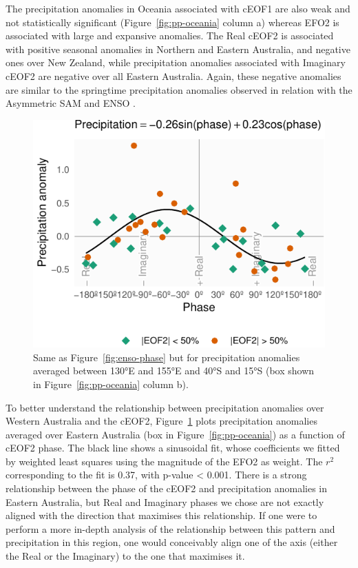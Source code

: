 \documentclass[smallextended]{svjour3}       %
\begin{document}
The precipitation anomalies in Oceania associated with cEOF1 are also weak and not statistically significant (Figure~\ref{fig:pp-oceania} column a) whereas EFO2 is associated with large and expansive anomalies. The Real cEOF2 is associated with positive seasonal anomalies in Northern and Eastern Australia, and negative ones over New Zealand, while precipitation anomalies associated with Imaginary cEOF2 are negative over all Eastern Australia. Again, these negative anomalies are similar to the springtime precipitation anomalies observed in relation with the Asymmetric SAM \citep{campitelli2021} and ENSO \citep{cai2011}.



\begin{figure}
\centering
\includegraphics{../figures/australia-pp-phase-1.pdf}
\caption{\label{fig:australia-pp-phase}Same as Figure~\ref{fig:enso-phase} but for precipitation anomalies averaged between 130°E and 155°E and 40°S and 15°S (box shown in Figure~\ref{fig:pp-oceania} column b).}
\end{figure}

To better understand the relationship between precipitation anomalies over Western Australia and the cEOF2, Figure~\ref{fig:australia-pp-phase} plots precipitation anomalies averaged over Eastern Australia (box in Figure~\ref{fig:pp-oceania}) as a function of cEOF2 phase. The black line shows a sinusoidal fit, whose coefficients we fitted by weighted least squares using the magnitude of the EFO2 as weight. The \(r^2\) corresponding to the fit is 0.37, with p-value \textless{} 0.001. There is a strong relationship between the phase of the cEOF2 and precipitation anomalies in Eastern Australia, but Real and Imaginary phases we chose are not exactly aligned with the direction that maximises this relationship. If one were to perform a more in-depth analysis of the relationship between this pattern and precipitation in this region, one would conceivably align one of the axis (either the Real or the Imaginary) to the one that maximises it.
\end{document}

